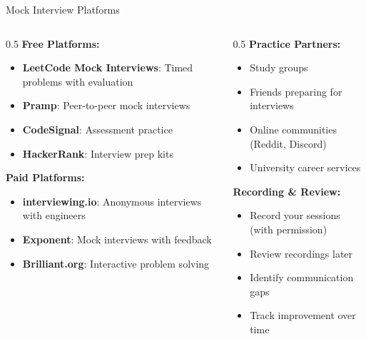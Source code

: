 \documentclass[aspectratio=169,xcolor=dvipsnames]{beamer}
\begin{document}
\begin{frame}{Mock Interview Platforms}
  \begin{columns}
    \begin{column}{0.5\textwidth}
      \textbf{Free Platforms:}
      \begin{itemize}
        \item \textbf{LeetCode Mock Interviews}: Timed problems with evaluation
        \item \textbf{Pramp}: Peer-to-peer mock interviews
        \item \textbf{CodeSignal}: Assessment practice
        \item \textbf{HackerRank}: Interview prep kits
      \end{itemize}

      \vspace{0.3cm}
      \textbf{Paid Platforms:}
      \begin{itemize}
        \item \textbf{interviewing.io}: Anonymous interviews with engineers
        \item \textbf{Exponent}: Mock interviews with feedback
        \item \textbf{Brilliant.org}: Interactive problem solving
      \end{itemize}
    \end{column}

    \begin{column}{0.5\textwidth}
      \textbf{Practice Partners:}
      \begin{itemize}
        \item Study groups
        \item Friends preparing for interviews
        \item Online communities (Reddit, Discord)
        \item University career services
      \end{itemize}

      \vspace{0.3cm}
      \textbf{Recording \& Review:}
      \begin{itemize}
        \item Record your sessions (with permission)
        \item Review recordings later
        \item Identify communication gaps
        \item Track improvement over time
      \end{itemize}
    \end{column}
  \end{columns}
\end{frame}
\end{document}
